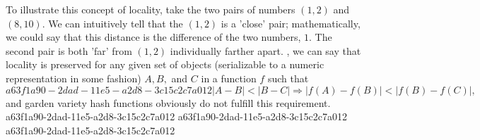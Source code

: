 \documentclass[12pt]{article}
\begin{document}
\par To illustrate this concept of locality, take the two pairs of numbers $(1,2)$ and $(8,10)$. We can intuitively tell that the $(1,2)$ is a 'close' pair; mathematically, we could say that this distance is the difference of the two numbers, $1$. The second pair is both 'far' from $(1,2)$ individually farther apart. , we can say that locality is preserved for any given set of objects (serializable to a numeric representation in some fashion) $A,B,$ and $C$ in a function $f$ such that
\begin{equation}
a63f1a90-2dad-11e5-a2d8-3c15c2c7a012|A-B| < |B-C| \Rightarrow |f(A)-f(B)| < |f(B) - f(C)|,
\end{equation}
and garden variety hash functions obviously do not fulfill this requirement.
a63f1a90-2dad-11e5-a2d8-3c15c2c7a012
a63f1a90-2dad-11e5-a2d8-3c15c2c7a012\printbibliography
a63f1a90-2dad-11e5-a2d8-3c15c2c7a012
\end{document}
